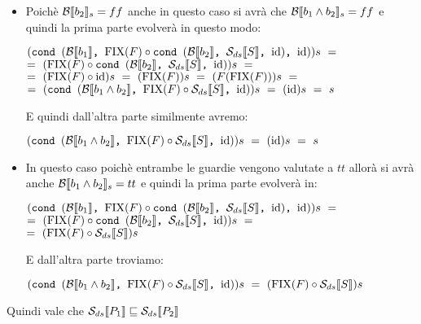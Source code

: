 {\begin{itemize}
        \item {} Poichè 
        $\evalBbs{b_2}{s}=ff$ anche in questo caso si avrà che 
        $\evalBbs{b_1\and{}b_2}{s}=ff$ e quindi la prima parte evolverà in
        questo modo:
        \begin{center}
        $(\cond{b_1}{\fixp{F} \circ \cond{b_2}{\Sds}{\idDS}}{\idDS})s~=$\\
        $=~(\fixp{F} \circ \cond{b_2}{\Sds}{\idDS})s~=$\\
        $=~(\fixp{F} \circ \idDS)s~=~(\fixp{F})s~=~(F(\fixp{F}))s~=$\\
        $=~(\cond{b_1\and{}b_2}{\fixp{F} \circ \Sds}{\idDS})s~=~(\idDS)s~=~s$
        \end{center}
        E quindi dall'altra parte similmente avremo:
        \begin{center}
        $(\cond{b_1\and{}b_2}{\fixp{F} \circ \Sds}{\idDS})s~=~(\idDS)s~=~s$
        \end{center}

        \item {} In questo
        caso poichè entrambe le guardie vengono valutate a $tt$ allorà si avrà
        anche $\evalBbs{b_1\and{}b_2}{s}=tt$ e quindi la prima parte evolverà
        in:
        \begin{center}
        $(\cond{b_1}{\fixp{F} \circ \cond{b_2}{\Sds}{\idDS}}{\idDS})s~=$\\
        $=~(\fixp{F} \circ \cond{b_2}{\Sds}{\idDS})s~=$\\
        $=~(\fixp{F} \circ \Sds)s$
        \end{center}
        E dall'altra parte troviamo:
        \begin{center}
        $(\cond{b_1\and{}b_2}{\fixp{F} \circ \Sds}{\idDS})s~
        =~(\fixp{F} \circ \Sds)s$
        \end{center}
    \end{itemize}
    Quindi vale che $\dsCtxt{P_1} \mineq \dsCtxt{P_2}$

}
